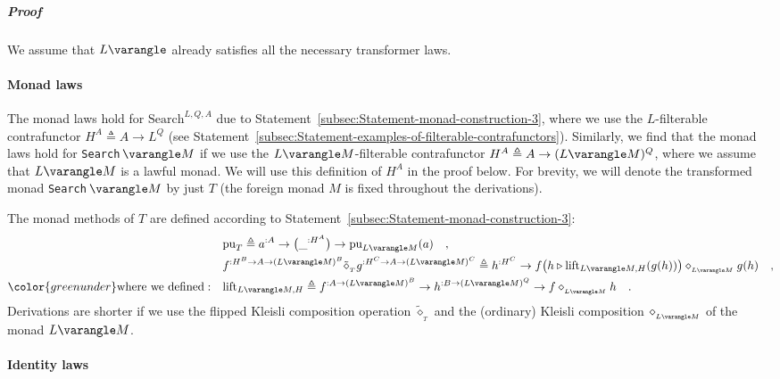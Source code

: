 \subparagraph{Proof}

We assume that $L\varangle$ already satisfies all the necessary transformer
laws.

\paragraph{Monad laws}

The monad laws hold for $\text{Search}^{L,Q,A}$ due to Statement~\ref{subsec:Statement-monad-construction-3},
where we use the $L$-filterable contrafunctor $H^{A}\triangleq A\rightarrow L^{Q}$
(see Statement~\ref{subsec:Statement-examples-of-filterable-contrafunctors}).
Similarly, we find that the monad laws hold for \lstinline!Search!$\,\varangle M$
if we use the $L\varangle M$-filterable contrafunctor $H^{A}\triangleq A\rightarrow(L\varangle M)^{Q}$,
where we assume that $L\varangle M$ is a lawful monad. We will use
this definition of $H^{A}$ in the proof below. For brevity, we will
denote the transformed monad \lstinline!Search!$\,\varangle M$ by
just $T$ (the foreign monad $M$ is fixed throughout the derivations). 

The monad methods of $T$ are defined according to Statement~\ref{subsec:Statement-monad-construction-3}:
\begin{align*}
 & \text{pu}_{T}\triangleq a^{:A}\rightarrow\big(\_^{:H^{A}}\big)\rightarrow\text{pu}_{L\varangle M}(a)\quad,\\
 & f^{:H^{B}\rightarrow A\rightarrow(L\varangle M)^{B}}\tilde{\diamond}_{_{T}}g^{:H^{C}\rightarrow A\rightarrow(L\varangle M)^{C}}\triangleq h^{:H^{C}}\rightarrow f\big(h\triangleright\text{lift}_{L\varangle M,H}(g(h))\big)\diamond_{_{L\varangle M}}g(h)\quad,\\
{\color{greenunder}\text{where we defined}:}\quad & \text{lift}_{L\varangle M,H}\triangleq f^{:A\rightarrow(L\varangle M)^{B}}\rightarrow h^{:B\rightarrow(L\varangle M)^{Q}}\rightarrow f\diamond_{_{L\varangle M}}h\quad.
\end{align*}
Derivations are shorter if we use the flipped Kleisli composition
operation $\tilde{\diamond}_{_{T}}$ and the (ordinary) Kleisli composition
$\diamond_{_{L\varangle M}}$ of the monad $L\varangle M$.

\paragraph{Identity laws}

